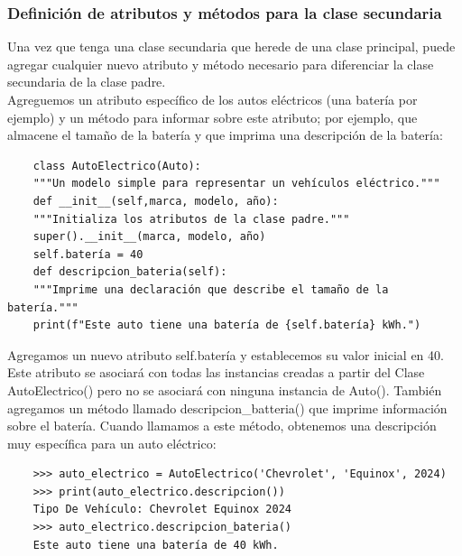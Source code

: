 {\subsubsection{Definición de atributos y métodos para la clase secundaria}

Una vez que tenga una clase secundaria que herede de una clase principal, puede agregar
cualquier nuevo atributo y método necesario para diferenciar la clase secundaria
de la clase padre.\\

Agreguemos un atributo específico de los autos eléctricos (una batería por ejemplo)
y un método para informar sobre este atributo; por ejemplo, que almacene el tamaño de la batería y que imprima una 
descripción de la batería:

\hspace{-2.6cm}{\ttfamily \scriptsize Auto}

\vspace{-0.2cm}
\hspace{-2.6cm}{\ttfamily \scriptsize Electrico.py}\vspace{-0.84cm}
\begin{lstlisting}
	class AutoElectrico(Auto):
	"""Un modelo simple para representar un vehículos eléctrico."""
	def __init__(self,marca, modelo, año):
	"""Initializa los atributos de la clase padre."""
	super().__init__(marca, modelo, año)
	self.batería = 40
	def descripcion_bateria(self):
	"""Imprime una declaración que describe el tamaño de la batería."""
	print(f"Este auto tiene una batería de {self.batería} kWh.")
\end{lstlisting}

Agregamos un nuevo atributo {\ttfamily self.batería} y establecemos su valor inicial en
40. Este atributo se asociará con todas las instancias creadas a partir del
Clase {\ttfamily AutoElectrico()} pero no se asociará con ninguna instancia de {\ttfamily Auto()}. 
También agregamos un método llamado {\ttfamily descripcion\_batteria()} que imprime información sobre el
batería. Cuando llamamos a este método, obtenemos una descripción muy específica para un auto eléctrico:

\begin{lstlisting}
	>>> auto_electrico = AutoElectrico('Chevrolet', 'Equinox', 2024)
	>>> print(auto_electrico.descripcion())
	Tipo De Vehículo: Chevrolet Equinox 2024
	>>> auto_electrico.descripcion_bateria()
	Este auto tiene una batería de 40 kWh.
\end{lstlisting}\label{bateria40}

}
